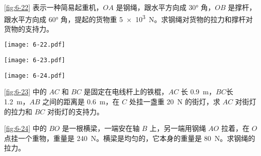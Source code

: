 \begin{Exercise}
\begin{question}
  \item \cref{fig:6-22} 表示一种简易起重机，$OA$ 是钢绳，跟水平方向成 \ang{30} 角，$OB$ 是撑杆，跟水平方向成 \ang{60} 角，提起的货物重 \qty{5e3}{N}。求钢绳对货物的拉力和撑杆对货物的支持力。
  \begin{figurehere}
    \begin{minipage}[b]{0.38\linewidth}
      \centering
      \texttt{[image: 6-22.pdf]}
      \caption{}\label{fig:6-22}
    \end{minipage}%
    \begin{minipage}[b]{0.3\linewidth}
      \centering
      \texttt{[image: 6-23.pdf]}
      \caption{}\label{fig:6-23}
    \end{minipage}%
    \begin{minipage}[b]{0.3\linewidth}
      \centering
      \texttt{[image: 6-24.pdf]}
      \caption{}\label{fig:6-24}
    \end{minipage}
  \end{figurehere}




\item \cref{fig:6-23} 中的 $AC$ 和 $BC$ 是固定在电线杆上的铁棍，$AC$ 长 \qty{0.9}{m}，$BC$长 \qty{1.2}{m}，$AB$ 之间的距离是 \qty{0.6}{m}，在 $C$ 处挂一盏重 \qty{20}{N} 的街灯，求 $AC$ 对街灯的拉力和 $BC$ 对街灯的支持力。
\item \cref{fig:6-24} 中的 $BO$ 是一根横梁，一端安在轴 $B$ 上，另一端用钢绳 $AO$ 拉着，在 $O$ 点挂一个重物，重量是 \qty{240}{N}。横梁是均匀的，它本身的重量是 \qty{80}{N}。求钢绳的拉力。


\end{question}
\end{Exercise}
